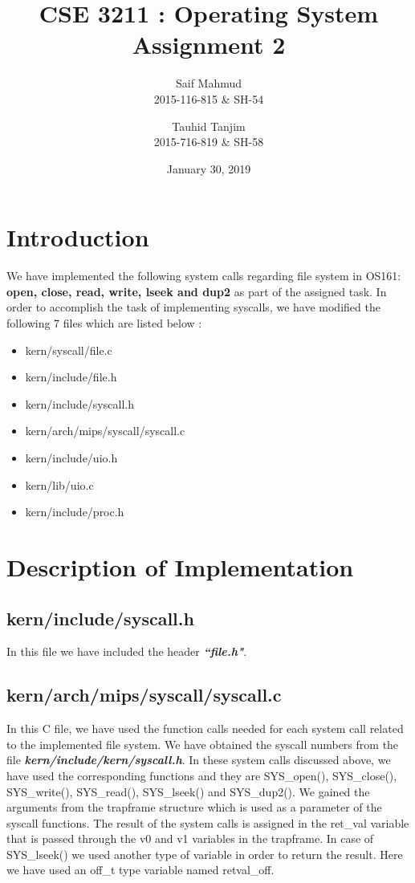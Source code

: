\documentclass[a4paper]{article}
\title{CSE 3211 : Operating System Assignment 2} %
\author{Saif Mahmud\\
	2015-116-815 \& SH-54
	\and
	Tauhid Tanjim\\
	2015-716-819 \& SH-58
}
\date{January 30, 2019}
\begin{document}
\maketitle

\section{Introduction}
\label{sec:intro}
We have implemented the following system calls regarding file system in OS161:\\ 
\textbf{open, close, read, write, lseek and dup2} as part of the assigned task. In order to accomplish the task of implementing syscalls, we have modified the following 7 files which are listed below :
\begin{itemize}
	\item kern/syscall/file.c
	\item kern/include/file.h
	\item kern/include/syscall.h
	\item kern/arch/mips/syscall/syscall.c
	\item kern/include/uio.h
	\item kern/lib/uio.c
	\item kern/include/proc.h
\end{itemize}

\section{Description of Implementation}
\label{sec:details}

\subsection{kern/include/syscall.h}
In this file we have included the header \textit{\textbf{``file.h"}}.

\subsection{kern/arch/mips/syscall/syscall.c}
In this C file, we have used the function calls needed for each system call related to the implemented file system. We have obtained the syscall numbers from the file \textit{\textbf{kern/include/kern/syscall.h}}. In these system calls discussed above, we have used the corresponding functions and they are SYS\_open(), SYS\_close(), SYS\_write(), SYS\_read(), SYS\_lseek() and SYS\_dup2(). We gained the arguments from the trapframe structure which is used as a parameter of the syscall functions. The result of the system calls is assigned in the ret\_val variable that is passed through the v0 and v1 variables in the trapframe. In case of SYS\_lseek() we used another type of variable in order to return the result. Here we have used an off\_t type variable named retval\_off.
\end{document}
